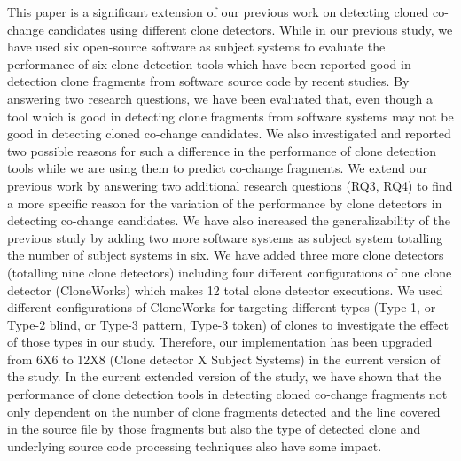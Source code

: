 \documentclass[review]{elsarticle}
\begin{document}
This paper is a significant extension of our previous work \cite{nadim-iwsc-2020} on detecting cloned co-change candidates using different clone detectors. While in our previous study, we have used six open-source software as subject systems to evaluate the performance of six clone detection tools which have been reported good in detection clone fragments from software source code by recent studies. By answering two research questions, we have been evaluated that, even though a tool which is good in detecting clone fragments from software systems may not be good in detecting cloned co-change candidates. We also investigated and reported two possible reasons for such a difference in the performance of clone detection tools while we are using them to predict co-change fragments. We extend our previous work by answering two additional research questions (RQ3, RQ4) to find a more specific reason for the variation of the performance by clone detectors in detecting co-change candidates. We have also increased the generalizability of the previous study by adding two more software systems as subject system totalling the number of subject systems in six. We have added three more clone detectors (totalling nine clone detectors) including four different configurations of one clone detector (CloneWorks) which makes 12 total clone detector executions. We used different configurations of CloneWorks for targeting different types (Type-1, or Type-2 blind, or Type-3 pattern, Type-3 token) of clones to investigate the effect of those types in our study. Therefore, our implementation has been upgraded from 6X6 to 12X8 (Clone detector X Subject Systems) in the current version of the study. In the current extended version of the study, we have shown that the performance of clone detection tools in detecting cloned co-change fragments not only dependent on the number of clone fragments detected and the line covered in the source file by those fragments but also the type of detected clone and underlying source code processing techniques also have some impact.

\end{document}
